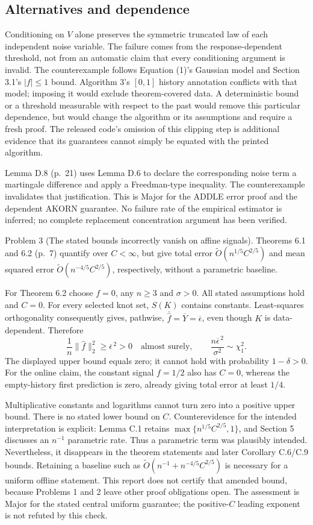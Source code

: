 \documentclass[10pt]{article}
\begin{document}
\subsection*{Alternatives and dependence}
Conditioning on \(V\) alone preserves the symmetric truncated law of each independent noise variable. The failure comes from the response-dependent threshold, not from an automatic claim that every conditioning argument is invalid. The counterexample follows Equation (1)’s Gaussian model and Section 3.1’s \(|f|\le1\) bound. Algorithm 3’s \([0,1]\) history annotation conflicts with that model; imposing it would exclude theorem-covered data. A deterministic bound or a threshold measurable with respect to the past would remove this particular dependence, but would change the algorithm or its assumptions and require a fresh proof. The released code’s omission of this clipping step is additional evidence that its guarantees cannot simply be equated with the printed algorithm.\par
Lemma D.8 (p. 21) uses Lemma D.6 to declare the corresponding noise term a martingale difference and apply a Freedman-type inequality. The counterexample invalidates that justification. This is Major for the ADDLE error proof and the dependent AKORN guarantee. No failure rate of the empirical estimator is inferred; no complete replacement concentration argument has been verified.\par
Problem 3 (The stated bounds incorrectly vanish on affine signals).  Theorems 6.1 and 6.2 (p. 7) quantify over \(C<\infty\), but give total error \(\widetilde O(n^{1/5}C^{2/5})\) and mean squared error \(\widetilde O(n^{-4/5}C^{2/5})\), respectively, without a parametric baseline.\par
For Theorem 6.2 choose \(f=0\), any \(n\ge3\) and \(\sigma>0\). All stated assumptions hold and \(C=0\). For every selected knot set, \(S(K)\) contains constants. Least-squares orthogonality consequently gives, pathwise, \(\overline{\widehat f}=\overline Y=\overline\epsilon\), even though \(K\) is data-dependent. Therefore \[\frac1n\|\widehat f\|_2^2\ge\overline\epsilon^{\,2}>0
 \quad\text{almost surely},\qquad
 \frac{n\overline\epsilon^{\,2}}{\sigma^2}\sim\chi^2_1.\] The displayed upper bound equals zero; it cannot hold with probability \(1-\delta>0\). For the online claim, the constant signal \(f=1/2\) also has \(C=0\), whereas the empty-history first prediction is zero, already giving total error at least \(1/4\).\par
Multiplicative constants and logarithms cannot turn zero into a positive upper bound. There is no stated lower bound on \(C\). Counterevidence for the intended interpretation is explicit: Lemma C.1 retains \(\max\{n^{1/5}C^{2/5},1\}\), and Section 5 discusses an \(n^{-1}\) parametric rate. Thus a parametric term was plausibly intended. Nevertheless, it disappears in the theorem statements and later Corollary C.6/C.9 bounds. Retaining a baseline such as \(\widetilde O(n^{-1}+n^{-4/5}C^{2/5})\) is necessary for a uniform offline statement. This report does not certify that amended bound, because Problems 1 and 2 leave other proof obligations open. The assessment is Major for the stated central uniform guarantee; the positive-\(C\) leading exponent is not refuted by this check.\par
\end{document}
